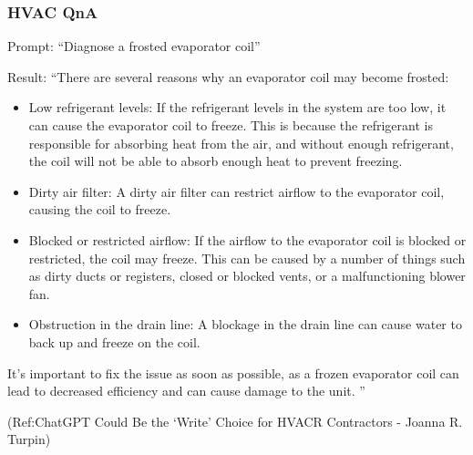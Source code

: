 \begin{frame}[fragile]\frametitle{HVAC QnA}
Prompt: ``Diagnose a frosted evaporator coil''

Result: 
``There are several reasons why an evaporator coil may become frosted:
\begin{itemize}
\item Low refrigerant levels: If the refrigerant levels in the system are too low, it can cause the
evaporator coil to freeze. This is because the refrigerant is responsible for absorbing heat
from the air, and without enough refrigerant, the coil will not be able to absorb enough heat
to prevent freezing.
\item Dirty air filter: A dirty air filter can restrict airflow to the evaporator coil, causing the coil
to freeze.
\item Blocked or restricted airflow: If the airflow to the evaporator coil is blocked or
restricted, the coil may freeze. This can be caused by a number of things such as dirty ducts or
registers, closed or blocked vents, or a malfunctioning blower fan.
\item Obstruction in the drain line: A blockage in the drain line can cause water to back up and freeze on the coil.
\end{itemize}	 
It's important to fix the issue as soon as possible, as a frozen evaporator coil can lead to decreased
efficiency and can cause damage to the unit.
''

\tiny{(Ref:ChatGPT Could Be the ‘Write’ Choice for HVACR Contractors - Joanna R. Turpin)}
\end{frame}

